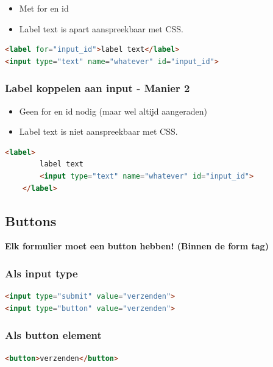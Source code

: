 \documentclass{article}
\newcommand{\bold}[1]{\textbf{#1}}
\begin{document}
\begin{itemize}
    \item Met for en id
    \item Label text is apart aanspreekbaar met CSS.
\end{itemize}

\begin{lstlisting}[language=HTML]
<label for="input_id">label text</label>
<input type="text" name="whatever" id="input_id">
\end{lstlisting}



\subsubsection{Label koppelen aan input - Manier 2}
\begin{itemize}
    \item Geen for en id nodig (maar wel altijd aangeraden)
    \item Label text is niet aanspreekbaar met CSS.
\end{itemize}

\begin{lstlisting}[language=HTML]
    <label>
        label text
        <input type="text" name="whatever" id="input_id">
    </label>
    \end{lstlisting}


\subsection{Buttons}
\bold{Elk formulier moet een button hebben! (Binnen de form tag)}

\subsubsection{Als input type}

\begin{lstlisting}[language=HTML]
<input type="submit" value="verzenden">
<input type="button" value="verzenden">
\end{lstlisting}

\subsubsection{Als button element}

\begin{lstlisting}[language=HTML]
<button>verzenden</button>
\end{lstlisting}
\end{document}
